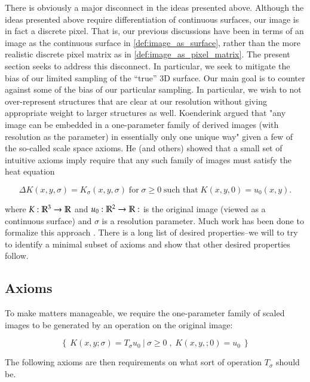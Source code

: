    
    There is obviously a major disconnect in the ideas presented above. 
    Although the ideas presented above require differentiation of continuous
    surfaces, our image is in fact a discrete pixel. That is, our previous discussions have been in terms of an image as the continuous surface in \cref{def:image_as_surface},
    rather than the more realistic discrete pixel matrix as in \cref{def:image_as_pixel_matrix}.
    The present section seeks to address this disconnect.
    In particular, we seek to mitigate the bias of our limited sampling
    of the ``true'' 3D surface. Our main goal is to counter against some of the bias of our particular sampling. In particular, we wish to not over-represent structures that
    are clear at our resolution without giving appropriate weight to larger structures as well.
    Koenderink \cite{Koenderink} argued that "any image can be embedded in a one-parameter family of derived images (with resolution as the parameter) in essentially only one unique way" given a few of the so-called scale space axioms. He (and others) showed that a small set of intuitive axioms imply require that any such family of images must satisfy the heat equation
    
    \begin{equation} \label{eq:heat-eq-for-family}
    \Delta K(x,y,\sigma) = K_\sigma (x,y,\sigma) 
    \;\text{for}\; \sigma \ge 0
    \;\text{such that}\; K(x,y, 0) = u_0(x,y).
    \end{equation}
    
    where $K: \mathbb{R}^3 \to \mathbb{R} $ and  $u_0: \mathbb{R}^2 \to \mathbb{R}: $ is the original image (viewed as a continuous surface) and $\sigma$ is a resolution parameter.
    Much work has been done to formalize this approach \cite{GSST-book}. There is a long list of desired properties--we will to try to identify a minimal subset of axioms and show that other desired properties follow.
    
	  
    
    \subsection{Axioms}
	 To make matters manageable, we require the one-parameter family of scaled images to be generated by an operation on the original image:
	 
	\[
		\left\{\ K(x,y;\sigma) = T_\sigma u_0
		\ \lvert \ 
		\sigma \ge 0
		\; ,\; K(x,y,;0) = u_0
		\ \right\} 
	\]
    
	The following axioms are then requirements on what sort
	of operation $T_\sigma$ should be.
		

